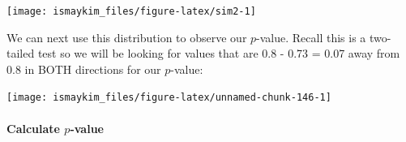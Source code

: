 \documentclass[]{tufte-book}
\newenvironment{Shaded}{\begin{snugshade}}{\end{snugshade}}
\newcommand{\KeywordTok}[1]{\textcolor[rgb]{0.13,0.29,0.53}{\textbf{{#1}}}}
\newcommand{\DataTypeTok}[1]{\textcolor[rgb]{0.13,0.29,0.53}{{#1}}}
\newcommand{\DecValTok}[1]{\textcolor[rgb]{0.00,0.00,0.81}{{#1}}}
\newcommand{\FloatTok}[1]{\textcolor[rgb]{0.00,0.00,0.81}{{#1}}}
\newcommand{\StringTok}[1]{\textcolor[rgb]{0.31,0.60,0.02}{{#1}}}
\newcommand{\NormalTok}[1]{{#1}}
\begin{document}
\begin{center}\texttt{[image: ismaykim\_files/figure-latex/sim2-1]} \end{center}

We can next use this distribution to observe our \(p\)-value. Recall
this is a two-tailed test so we will be looking for values that are 0.8
- 0.73 = 0.07 away from 0.8 in BOTH directions for our \(p\)-value:

\begin{Shaded}
\end{Shaded}

\begin{center}\texttt{[image: ismaykim\_files/figure-latex/unnamed-chunk-146-1]} \end{center}

\paragraph{\texorpdfstring{Calculate
\(p\)-value}{Calculate p-value}}\label{calculate-p-value-1}

\begin{Shaded}
\end{Shaded}
\end{document}
